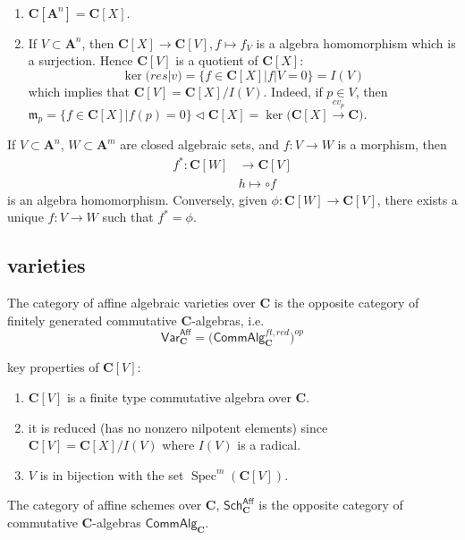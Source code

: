 \documentclass[
11pt, %
letterpaper， %
oneside, %
headinclude,footinclude, %
BCOR5mm, %
]{scrartcl}
\newcommand{\C}{{\mathbf{C}}}
\newcommand{\A}{{\mathbf{A}}}
\newcommand{\m}{{\mathfrak{m}}}
\newcommand{\var}{\mathsf{Var}}
\newcommand{\sch}{\mathsf{Sch}}
\newcommand{\aff}{\mathsf{Aff}}
\newcommand{\calg}{\mathsf{CommAlg}}
\newcommand{\spec}{\operatorname{Spec}}
\begin{document}
\begin{pr}
	\
	
\begin{enumerate}
	\item $\C[\A^n]=\C[X]$.
	\item If $V\subset \A^n$, then $\C[X]\to \C [V], f\mapsto f_V$ is a algebra homomorphism which is a surjection. Hence $\C[V]$ is a quotient of $\C[X]$:
	\begin{equation*}
	\ker (res|v)=\{f \in \C[X]| f|V=0 \}=I(V)
	\end{equation*}
	which implies that $\C[V]=\C[X]/I(V)$. Indeed, if $p\in V$, then $\m_p=\{f\in \C[X]| f(p)=0 \}\lhd \C[X]=\ker \Big( \C[X] \stackrel{ev_p}{\longrightarrow}\C\Big).$
\end{enumerate}
\end{pr}

If $V\subset \A^n$, $W\subset \A^m$ are closed algebraic sets, and $f:V\to W$ is a morphism, then 
\begin{align*}
f^*: \C[W]&\longrightarrow \C[V]\\&h \mapsto \circ f
\end{align*}
is an algebra homomorphism. Conversely, given $\phi: \C[W]\to \C[V]$, there exists a unique $f:V\to W$ such that $f^*=\phi$.

\subsection{varieties}
\begin{definition}
	The category of affine algebraic varieties over $\C$ is the opposite category of finitely generated commutative $\C$-algebras, i.e.
	\begin{equation*}
	\var^{\aff}_{\C}=\Big(\calg_{\C}^{ft,red} \Big)^{op}
	\end{equation*}
\end{definition}
\begin{pr}
	key properties of $\C[V]$:
	\begin{enumerate}
		\item $\C[V]$ is a finite type commutative algebra over $\C$.
		\item it is reduced (has no nonzero nilpotent elements) since $\C[V]=\C[X]/I(V)$ where $I(V)$ is a radical.
		\item $V$ is in bijection with the set $\spec^m(\C[V])$.
	\end{enumerate}
\end{pr}
\begin{definition}
	The category of affine schemes over $\C$, $\sch^{\aff}_{\C}$  is the opposite category of commutative $\C$-algebras $\calg_{\C}$.
\end{definition}
\end{document}
